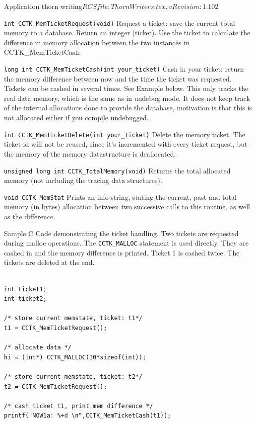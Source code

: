 \begin{cactuspart}{2}{Application thorn writing}{$RCSfile: ThornWriters.tex,v $}{$Revision: 1.102 $}
\begin{Lentry}
\item[{\tt int CCTK\_MemTicketRequest(void)}]
	Request a ticket: save the current total memory to a database.
	Return an integer (ticket). Use the ticket to calculate the
	difference in memory allocation between the two instances in
 	CCTK\_MemTicketCash.	

\item[{\tt long int CCTK\_MemTicketCash(int your\_ticket)}]
	Cash in your ticket: return the memory difference between now and the
     	time the ticket was requested. Tickets can be cashed in
	several times. See Example below.
     	This only tracks the real data memory, which is the same as in
     	undebug mode. It does not keep track of the internal allocations
     	done to provide the database, motivation is that this is not
 	allocated either if you compile undebugged.

\item[{\tt int CCTK\_MemTicketDelete(int your\_ticket)}]
	Delete the memory ticket. The ticket-id will not be reused, since
        it's incremented with every ticket request, but the memory of
	the memory datastructure is deallocated.

\item[{\tt unsigned long int CCTK\_TotalMemory(void)}]
	Returns the total allocated memory (not including the tracing
        data structures).

\item[{\tt void CCTK\_MemStat}] Prints an info string, stating the current,
 	past and total memory (in bytes) allocation between two
	successive calls to this routine, as well as the difference.
\end{Lentry}

Sample C Code demonstrating the ticket handling. Two tickets are
requested during malloc operations. The {\tt CCTK\_MALLOC} statement is
used directly. They are cashed in and the memory
difference is printed. Ticket 1 is cashed twice. The tickets are
deleted at the end.
\begin{verbatim}

int ticket1;
int ticket2;

/* store current memstate, ticket: t1*/
t1 = CCTK_MemTicketRequest();

/* allocate data */	
hi = (int*) CCTK_MALLOC(10*sizeof(int));

/* store current memstate, ticket: t2*/
t2 = CCTK_MemTicketRequest();
	
/* cash ticket t1, print mem difference */	
printf("NOW1a: %+d \n",CCTK_MemTicketCash(t1));


\end{verbatim}
\end{cactuspart}
